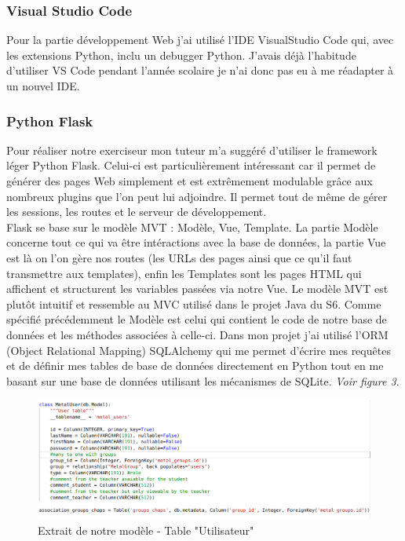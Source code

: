 \documentclass[12pt]{article}
\begin{document}
\subsubsection{Visual Studio Code}
Pour la partie développement Web j'ai utilisé l'IDE  VisualStudio Code qui, avec les extensions Python, inclu un debugger Python. J'avais déjà l'habitude d'utiliser VS Code pendant l'année scolaire je n'ai donc pas eu à me réadapter à un nouvel IDE.

\subsubsection{Python Flask}

Pour réaliser notre exerciseur mon tuteur m’a suggéré d’utiliser le framework léger Python Flask. Celui-ci est particulièrement intéressant car il permet de générer des pages Web simplement et est extrêmement modulable grâce aux nombreux plugins que l’on peut lui adjoindre. Il permet tout de même de gérer les sessions, les routes et le serveur de développement. \\
Flask se base sur le modèle MVT : Modèle, Vue, Template. La partie Modèle concerne tout ce qui va être intéractions avec la base de données, la partie Vue est là on l'on gère nos routes (les URLs des pages ainsi que ce qu'il faut transmettre aux templates), enfin les Templates sont les pages HTML qui affichent et structurent les variables passées via notre Vue. Le modèle MVT est plutôt intuitif et ressemble au MVC utilisé dans le projet Java du S6. 
Comme spécifié précédemment le Modèle est celui qui contient le code de notre base de données et les méthodes associées à celle-ci. Dans mon projet j'ai utilisé l'ORM (Object Relational Mapping) SQLAlchemy qui me permet d'écrire mes requêtes et de définir mes tables de base de données directement en Python tout en me basant sur une base de données utilisant les mécanismes de SQLite. \textit{Voir figure 3.}

\begin{figure}[h]
    \centering
    \includegraphics[scale=0.3]{ex_models.png}
    \caption{Extrait de notre modèle - Table "Utilisateur" }
    \label{fig:ex_models}
\end{figure}
\end{document}
